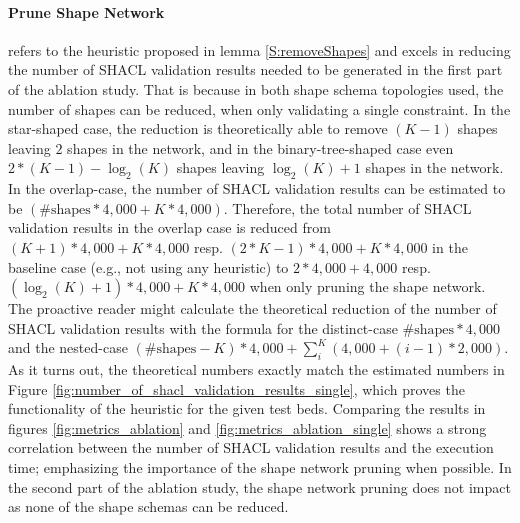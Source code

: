 \paragraph{Prune Shape Network} refers to the heuristic proposed in lemma \ref{S:removeShapes} and excels in reducing the number of SHACL validation results needed to be generated in the first part of the ablation study. That is because in both shape schema topologies used, the number of shapes can be reduced, when only validating a single constraint. In the star-shaped case, the reduction is theoretically able to remove $(K - 1)$ shapes leaving $2$ shapes in the network, and in the binary-tree-shaped case even $2 * (K - 1) - \log_2(K)$ shapes leaving $\log_2(K) + 1$ shapes in the network. In the \glqq overlap\grqq{}-case, the number of SHACL validation results can be estimated to be $(\text{\#shapes} * 4,000 + K * 4,000)$. Therefore, the total number of SHACL validation results in the \glqq overlap\grqq{} case is reduced from $(K + 1) * 4,000 + K * 4,000$ resp. $(2*K - 1) * 4,000 + K * 4,000$ in the baseline case (e.g., not using any heuristic) to $2 * 4,000 + 4,000$ resp. $(\log_2(K) + 1) * 4,000 + K * 4,000$ when only pruning the shape network. The proactive reader might calculate the theoretical reduction of the number of SHACL validation results with the formula for the \glqq distinct\grqq{}-case $\text{\#shapes} * 4,000$ and the \glqq nested\grqq{}-case $(\text{\#shapes} - K) * 4,000 + \sum_i^K (4,000 + (i - 1) * 2,000)$. 
As it turns out, the theoretical numbers exactly match the estimated numbers in Figure \ref{fig:number_of_shacl_validation_results_single}, which proves the functionality of the heuristic for the given test beds. Comparing the results in figures \ref{fig:metrics_ablation} and \ref{fig:metrics_ablation_single} shows a strong correlation between the number of SHACL validation results and the execution time; emphasizing the importance of the shape network pruning when possible. In the second part of the ablation study, the shape network pruning does not impact as none of the shape schemas can be reduced. 

